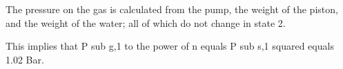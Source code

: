 The pressure on the gas is calculated from the pump, the weight of the piston, and the weight of the water; all of which do not change in state 2.

This implies that P sub g,1 to the power of n equals P sub s,1 squared equals 1.02 Bar.